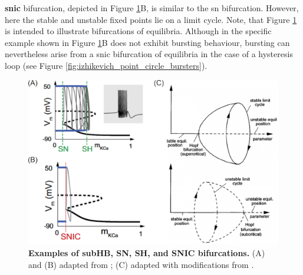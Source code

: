 \documentclass[../main.tex]{subfiles}
\begin{document}
\textbf{\gls{snic}} bifurcation, depicted in Figure \ref{fig:example_bifurcations_subhb_sn_sh_snic}B, is similar to the \gls{sn} bifurcation. However, here the stable and unstable fixed points lie on a limit cycle. Note, that Figure \ref{fig:example_bifurcations_subhb_sn_sh_snic} is intended to illustrate bifurcations of equilibria. Although in the specific example shown in Figure \ref{fig:example_bifurcations_subhb_sn_sh_snic}B does not exhibit bursting behaviour, bursting can nevertheless arise from a \gls{snic} bifurcation of equilibria in the case of a hysteresis loop (see Figure \ref{fig:izhikevich_point_circle_bursters}).

\begin{figure}[!t]
    \centering
    \includegraphics[width=0.95\linewidth]{../img/2_mathematical_overview/bifurcation_examples.png}
    \caption[Examples of subHB, SN, SH, and SNIC bifurcations]{
        \textbf{Examples of subHB, SN, SH, and SNIC bifurcations.}
        (A) and (B) adapted from \parencite{franciRobustTunableBursting2018}; (C) adapted with modifications from \parencite{luceroTheoreticalStudyHysteresis1999}.
    }
    \label{fig:example_bifurcations_subhb_sn_sh_snic}
\end{figure}
\end{document}
